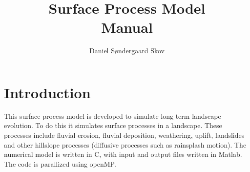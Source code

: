\documentclass[a4paper,12pt,oneside,article,]{memoir}
\begin{document}
\author{Daniel Søndergaard Skov}
\title{Surface Process Model \\ Manual}
\maketitle
	\thispagestyle{empty}
	\clearpage
	\setcounter{page}{1}

	\frontmatter
	\tableofcontents
	\mainmatter
	

\chapter{Introduction}
This surface process model is developed to simulate long term landscape evolution. To do this it simulates surface processes in a landscape. These processes include fluvial erosion, fluvial deposition, weathering, uplift, landslides and other hillslope processes (diffusive processes such as rainsplash motion). The numerical model is written in C, with input and output files written in Matlab. 
The code is parallized using openMP.
\end{document}
